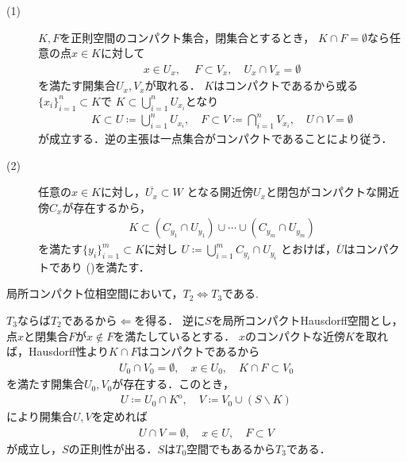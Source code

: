 	\begin{prf}\mbox{}
		\begin{description}
			\item[(1)]
				$K,F$を正則空間のコンパクト集合，閉集合とするとき，
				$K \cap F = \emptyset$なら任意の点$x \in K$に対して
				\begin{align}
					x \in U_x,\ \quad F \subset V_x,
					\quad U_x \cap V_x = \emptyset
				\end{align}
				を満たす開集合$U_x,V_x$が取れる．
				$K$はコンパクトであるから或る$\{x_i\}_{i=1}^n \subset K$で
				$K \subset \bigcup_{i=1}^n U_{x_i}$となり
				\begin{align}
					K \subset U \coloneqq \bigcup_{i=1}^n U_{x_i},
					\quad F \subset V \coloneqq \bigcap_{i=1}^n V_{x_i},
					\quad U \cap V = \emptyset
				\end{align}
				が成立する．逆の主張は一点集合がコンパクトであることにより従う．
			\item[(2)]
				任意の$x \in K$に対し，$\overline{U_x} \subset W$
				となる開近傍$U_x$と閉包がコンパクトな開近傍$C_x$が存在するから，
				\begin{align}
					K \subset (C_{y_1} \cap U_{y_1}) \cup \cdots \cup (C_{y_m} \cap U_{y_m})
				\end{align}
				を満たす$\{y_i\}_{i=1}^m \subset K$に対し
				$U \coloneqq \bigcup_{i=1}^m C_{y_i} \cap U_{y_i}$
				とおけば，$\overline{U}$はコンパクトであり
				()を満たす．
				\QED
		\end{description}
	\end{prf}
	
	\begin{screen}
		\begin{thm}
		\label{thm:T_2_equals_to_T_3_in_locally_compact_spaces}
			局所コンパクト位相空間において，$T_2 \Longleftrightarrow T_3$である.
		\end{thm}
	\end{screen}
	
	\begin{prf}
		$T_3$ならば$T_2$であるから$\Longleftarrow$を得る．
		逆に$S$を局所コンパクトHausdorff空間とし，点$x$と閉集合$F$が$x \notin F$を満たしているとする．
		$x$のコンパクトな近傍$K$を取れば，Hausdorff性より$K \cap F$はコンパクトであるから
		\begin{align}
			U_0 \cap V_0 = \emptyset, \quad x \in U_0,  \quad K \cap F \subset V_0
		\end{align}
		を満たす開集合$U_0,V_0$が存在する．このとき，
		\begin{align}
			U \coloneqq U_0 \cap K^{\mathrm{o}},
			\quad V \coloneqq V_0 \cup (S \backslash K)
		\end{align}
		により開集合$U,V$を定めれば
		\begin{align}
			U \cap V = \emptyset,
			\quad x \in U,
			\quad F \subset V
		\end{align}
		が成立し，$S$の正則性が出る．$S$は$T_0$空間でもあるから$T_3$である．
		\QED
	\end{prf}
	
